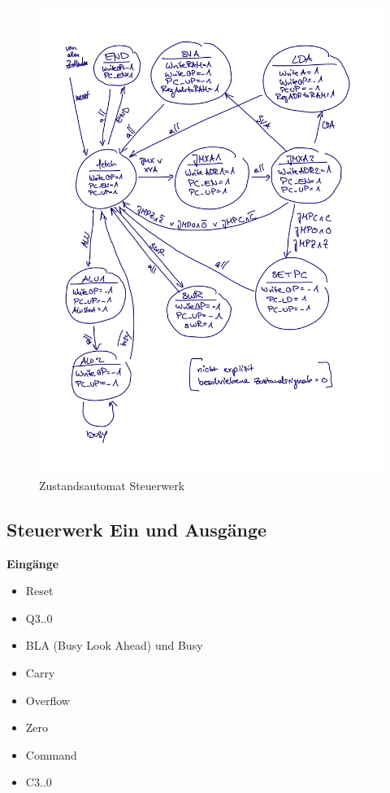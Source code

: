\begin{figure}[ht]
    \centering
    \includegraphics[scale=0.2]
    {content/figures/SW_Zustaende.jpg}
    \caption{Zustandsautomat Steuerwerk}
    \label{fig:SW_Zustaende}
\end{figure}

\subsection{Steuerwerk Ein und Ausgänge}
\label{sec:steuerwerk-ein-und-ausgänge}

\textbf{Eingänge}
\begin{itemize}
    \item Reset
    \item Q3..0
    \item BLA (Busy Look Ahead) und Busy
    \item Carry
    \item Overflow
    \item Zero
    \item Command
    \item C3..0
\end{itemize}


